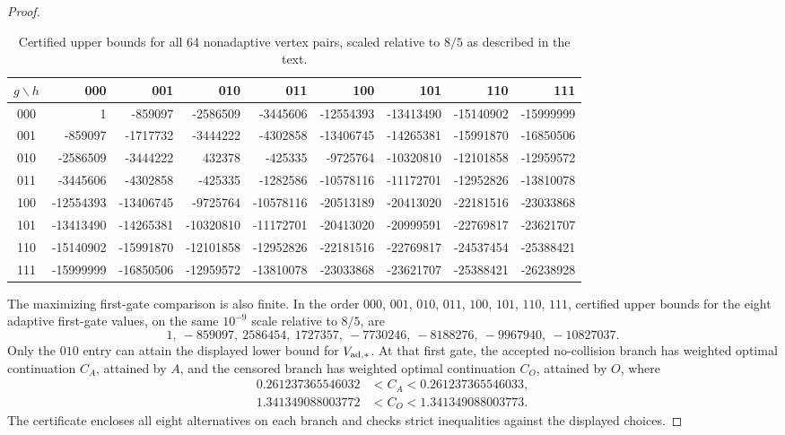 \begin{proof}
\begin{table}[ht]
\centering\small
\setlength{\tabcolsep}{4pt}
\begin{tabular}{c|rrrrrrrr}
\toprule
$g\backslash h$ & 000 & 001 & 010 & 011 & 100 & 101 & 110 & 111\\
\midrule
000 & 1 & -859097 & -2586509 & -3445606 & -12554393 & -13413490 & -15140902 & -15999999\\
001 & -859097 & -1717732 & -3444222 & -4302858 & -13406745 & -14265381 & -15991870 & -16850506\\
010 & -2586509 & -3444222 & 432378 & -425335 & -9725764 & -10320810 & -12101858 & -12959572\\
011 & -3445606 & -4302858 & -425335 & -1282586 & -10578116 & -11172701 & -12952826 & -13810078\\
100 & -12554393 & -13406745 & -9725764 & -10578116 & -20513189 & -20413020 & -22181516 & -23033868\\
101 & -13413490 & -14265381 & -10320810 & -11172701 & -20413020 & -20999591 & -22769817 & -23621707\\
110 & -15140902 & -15991870 & -12101858 & -12952826 & -22181516 & -22769817 & -24537454 & -25388421\\
111 & -15999999 & -16850506 & -12959572 & -13810078 & -23033868 & -23621707 & -25388421 & -26238928\\
\bottomrule
\end{tabular}
\caption{Certified upper bounds for all 64 nonadaptive vertex pairs,
scaled relative to $8/5$ as described in the text.}\label{tab:all64}
\end{table}

The maximizing first-gate comparison is also finite. In the order
$000$, $001$, $010$, $011$, $100$, $101$, $110$, $111$, certified upper bounds for the eight
adaptive first-gate values, on the same $10^{-9}$ scale relative to $8/5$, are
\[
1,\ -859097,\ 2586454,\ 1727357,\ -7730246,\ -8188276,\ -9967940,\ -10827037.
\]
Only the $010$ entry can attain the displayed lower bound for
$V_{\rm ad,*}$. At that first gate, the accepted no-collision branch has
weighted optimal continuation $C_A$, attained by $A$, and the censored
branch has weighted optimal continuation $C_O$, attained by $O$, where
\[
 \begin{aligned}
 0.261237365546032&<C_A<0.261237365546033,\\
 1.341349088003772&<C_O<1.341349088003773.
 \end{aligned}
\]
The certificate encloses all eight alternatives on each branch and checks
strict inequalities against the displayed choices.


\end{proof}
